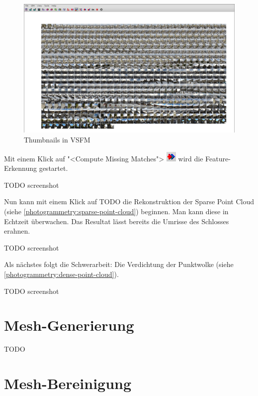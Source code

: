 \begin{figure}[H]
	\centering
	\includegraphics[width=\textwidth]{images/vsfm_thumbnails.png}
	\caption{Thumbnails in VSFM}
	\label{img:vsm_thumbnails}
\end{figure}

\noindent Mit einem Klick auf "<Compute Missing Matches">
\includegraphics[scale=0.75]{images/vsfm_icon_compute} wird die
Feature-Erkennung gestartet.

TODO screenshot

Nun kann mit einem Klick auf TODO die Rekonstruktion der Sparse Point Cloud
(siehe \autoref{photogrammetry:sparse-point-cloud}) beginnen. Man kann diese in
Echtzeit überwachen. Das Resultat lässt bereits die Umrisse des Schlosses
erahnen.

TODO screenshot

Als nächstes folgt die Schwerarbeit: Die Verdichtung der Punktwolke (siehe
\autoref{photogrammetry:dense-point-cloud}).

TODO screenshot



\section{Mesh-Generierung}

TODO


\section{Mesh-Bereinigung}

